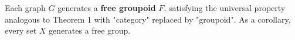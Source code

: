 Each graph $G$ generates a \textbf{free groupoid} $F$, satisfying the universal property analogous to Theorem 1 with "category" replaced by "groupoid". As a corollary, every set $X$ generates a free group.